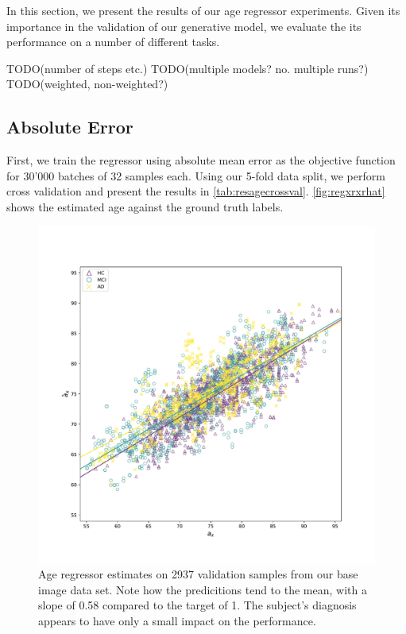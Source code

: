 In this section, we present the results of our age regressor experiments. Given its importance in the validation of our generative model, we evaluate the its performance on a number of different tasks.

TODO(number of steps etc.)
TODO(multiple models? no. multiple runs?)
TODO(weighted, non-weighted?)

\subsection*{Absolute Error}
First, we train the regressor using absolute mean error as the objective function for 30'000 batches of 32 samples each. Using our 5-fold data split, we perform cross validation and present the results in \autoref{tab:resagecrossval}. \autoref{fig:regxrxrhat} shows the estimated age against the ground truth labels.

\begin{figure}
	\centering
	\includegraphics[width=.9\linewidth]{images/age_plots/xr_xrhat} 
	\vspace*{-15pt}
	\caption{Age regressor estimates on 2937 validation samples from our base image data set. Note how the predicitions tend to the mean, with a slope of 0.58 compared to the target of 1. The subject's diagnosis appears to have only a small impact on the performance.}
	\label{fig:regxrxrhat}
\end{figure}

